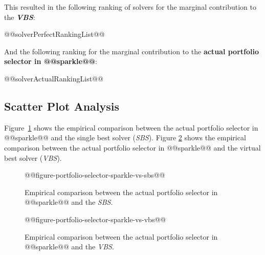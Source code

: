 \documentclass[british]{article}
\newif\iftest
\begin{document}
This resulted in the following ranking of solvers for the marginal contribution to the \textbf{{\em VBS}}:

\begin{enumerate}
@@solverPerfectRankingList@@
\end{enumerate}

And the following ranking for the marginal contribution to the \textbf{actual portfolio selector in @@sparkle@@}:

\begin{enumerate} 
@@solverActualRankingList@@
\end{enumerate}


\subsection{Scatter Plot Analysis}

Figure~\ref{fig:sparkle_vs_sbs} shows the empirical comparison between the actual portfolio selector in @@sparkle@@ and the single best solver (\emph{SBS}).
Figure \ref{fig:sparkle_vs_vbs} shows the empirical comparison between the actual portfolio selector in @@sparkle@@ and the virtual best solver (\emph{VBS}).

\begin{figure}[htbp]
\noindent \begin{centering}
@@figure-portfolio-selector-sparkle-vs-sbs@@
\par\end{centering}

\caption{Empirical comparison between the actual portfolio selector in @@sparkle@@ and the \emph{SBS}.}\label{fig:sparkle_vs_sbs}
\end{figure}

\begin{figure}[htbp]
\noindent \begin{centering}
@@figure-portfolio-selector-sparkle-vs-vbs@@
\par\end{centering}

\caption{Empirical comparison between the actual portfolio selector in @@sparkle@@ and the \emph{VBS}.}\label{fig:sparkle_vs_vbs}
\end{figure}


\iftest
\section{Experimental Results on the Test Set}
\label{sec:Experimental_Results_Test}

In this section, the PAR10 results for the current portfolio selector in @@sparkle@@ on solving the test instance set @@testInstanceClass@@ is reported.

\begin{itemize}
\item \textbf{Actual Portfolio Selector in @@sparkle@@}, PAR10: @@testActualPAR10@@
\end{itemize}
\fi




\end{document}
